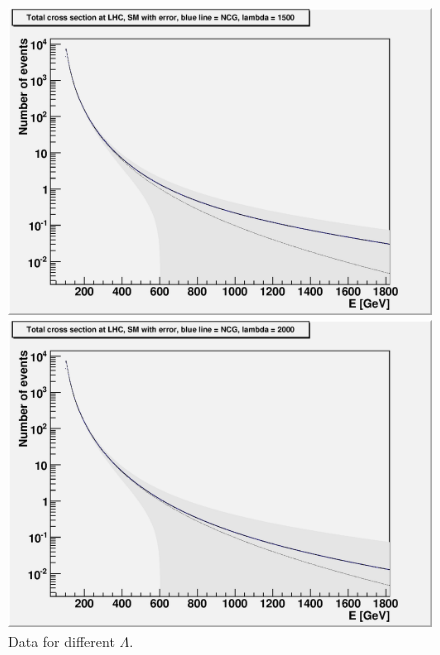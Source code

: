 \begin{figure}[htp]
\begin{minipage}[b]{0.475\linewidth}
	  \includegraphics[scale=0.35]{./images/L1500r139.eps}
	\end{minipage}
	\hspace{0.5cm}
	\begin{minipage}[b]{0.475\linewidth} 
    \centering
	  \includegraphics[scale=0.35]{./images/L2000r139.eps}
	\end{minipage}
		\caption{Data for different $\Lambda$.}
\end{figure}